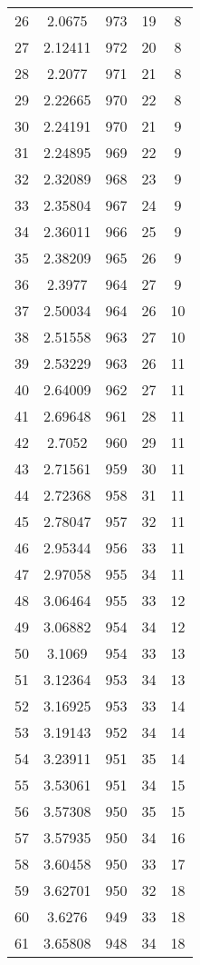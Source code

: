 \documentclass[12pt,a4paper]{article}
\begin{document}
\begin{tabular}{r|cccc}
	26 & 2.0675 & 973 & 19 & 8 \\
	27 & 2.12411 & 972 & 20 & 8 \\
	28 & 2.2077 & 971 & 21 & 8 \\
	29 & 2.22665 & 970 & 22 & 8 \\
	30 & 2.24191 & 970 & 21 & 9 \\
	31 & 2.24895 & 969 & 22 & 9 \\
	32 & 2.32089 & 968 & 23 & 9 \\
	33 & 2.35804 & 967 & 24 & 9 \\
	34 & 2.36011 & 966 & 25 & 9 \\
	35 & 2.38209 & 965 & 26 & 9 \\
	36 & 2.3977 & 964 & 27 & 9 \\
	37 & 2.50034 & 964 & 26 & 10 \\
	38 & 2.51558 & 963 & 27 & 10 \\
	39 & 2.53229 & 963 & 26 & 11 \\
	40 & 2.64009 & 962 & 27 & 11 \\
	41 & 2.69648 & 961 & 28 & 11 \\
	42 & 2.7052 & 960 & 29 & 11 \\
	43 & 2.71561 & 959 & 30 & 11 \\
	44 & 2.72368 & 958 & 31 & 11 \\
	45 & 2.78047 & 957 & 32 & 11 \\
	46 & 2.95344 & 956 & 33 & 11 \\
	47 & 2.97058 & 955 & 34 & 11 \\
	48 & 3.06464 & 955 & 33 & 12 \\
	49 & 3.06882 & 954 & 34 & 12 \\
	50 & 3.1069 & 954 & 33 & 13 \\
	51 & 3.12364 & 953 & 34 & 13 \\
	52 & 3.16925 & 953 & 33 & 14 \\
	53 & 3.19143 & 952 & 34 & 14 \\
	54 & 3.23911 & 951 & 35 & 14 \\
	55 & 3.53061 & 951 & 34 & 15 \\
	56 & 3.57308 & 950 & 35 & 15 \\
	57 & 3.57935 & 950 & 34 & 16 \\
	58 & 3.60458 & 950 & 33 & 17 \\
	59 & 3.62701 & 950 & 32 & 18 \\
	60 & 3.6276 & 949 & 33 & 18 \\
	61 & 3.65808 & 948 & 34 & 18 \\

\end{tabular}
\end{document}
